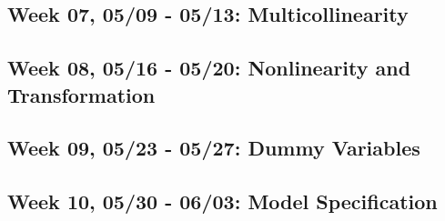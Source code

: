 \documentclass[11pt,]{article}
\begin{document}
\hypertarget{week-07-0509---0513-multicollinearity}{%
\subsection{Week 07, 05/09 - 05/13:
Multicollinearity}\label{week-07-0509---0513-multicollinearity}}

\hypertarget{week-08-0516---0520-nonlinearity-and-transformation}{%
\subsection{Week 08, 05/16 - 05/20: Nonlinearity and
Transformation}\label{week-08-0516---0520-nonlinearity-and-transformation}}

\hypertarget{week-09-0523---0527-dummy-variables}{%
\subsection{Week 09, 05/23 - 05/27: Dummy
Variables}\label{week-09-0523---0527-dummy-variables}}

\hypertarget{week-10-0530---0603-model-specification}{%
\subsection{Week 10, 05/30 - 06/03: Model
Specification}\label{week-10-0530---0603-model-specification}}
\end{document}
